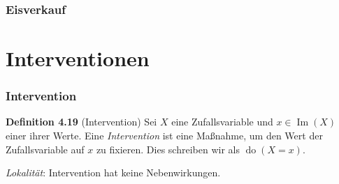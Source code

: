 \documentclass{beamer}
\newcommand{\Do}{\operatorname{do}}
\newcommand{\Bild}{\operatorname{Im}}
\newcommand{\klein}[1]{{\scriptsize #1}}
\begin{document}
\begin{frame}
\frametitle{Eisverkauf}

\begin{center}
\end{center}
\end{frame}

\section{Interventionen}

\begin{frame}
\frametitle{Intervention}

\begin{block}{\textbf{Definition 4.19} \klein{(Intervention)}}
Sei $X$ eine Zufallsvariable und $x \in \Bild(X)$ einer ihrer Werte. Eine \textit{Intervention} ist eine Maßnahme, um den Wert der Zufallsvariable auf $x$ zu fixieren. Dies schreiben wir als $\Do(X = x)$.
\end{block}

\pause
\vspace*{2\baselineskip}

\textit{Lokalität}: Intervention hat keine Nebenwirkungen.
\end{frame}
\end{document}
